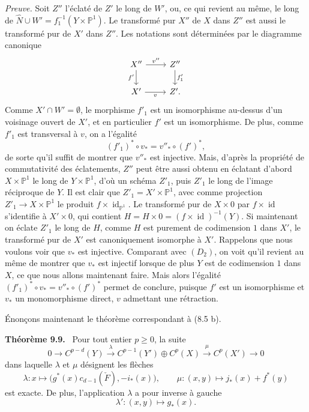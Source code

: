 \documentclass[11pt]{article}
\newenvironment{statement}[1]{\par\medskip\noindent\textbf{#1.}\ }{\par\medskip}
\begin{document}
\emph{Preuve.} Soit $Z''$ l'éclaté de $Z'$ le long de $W'$, ou, ce qui revient au même, le long de $\widehat N\cup W'=f_1^{-1}(Y\times\mathbb P^1)$. Le transformé pur $X''$ de $X$ dans $Z''$ est aussi le transformé pur de $X'$ dans $Z''$. Les notations sont déterminées par le diagramme canonique
\[
\begin{tikzcd}
X''\arrow[r,"v''"]\arrow[d,"f'"']&Z''\arrow[d,"f'_1"]\\
X'\arrow[r,"v"']&Z'.
\end{tikzcd}
\]
Comme $X'\cap W'=\emptyset$, le morphisme $f'_1$ est un isomorphisme au-dessus d'un voisinage ouvert de $X'$, et en particulier $f'$ est un isomorphisme. De plus, comme $f'_1$ est transversal à $v$, on a l'égalité
\[
(f'_1)^*\circ v_*=v''_*\circ(f')^*,
\tag{9.8.8}
\]
de sorte qu'il suffit de montrer que $v''_*$ est injective. Mais, d'après la propriété de commutativité des éclatements, $Z''$ peut être aussi obtenu en éclatant d'abord $X\times\mathbb P^1$ le long de $Y\times\mathbb P^1$, d'où un schéma $Z'_1$, puis $Z'_1$ le long de l'image réciproque de $Y$. Il est clair que $Z'_1=X'\times\mathbb P^1$, avec comme projection $Z'_1\to X\times\mathbb P^1$ le produit $f\times\operatorname{id}_{\mathbb P^1}$. Le transformé pur de $X\times0$ par $f\times\operatorname{id}$ s'identifie à $X'\times0$, qui contient $H=H\times0=(f\times\operatorname{id})^{-1}(Y)$. Si maintenant on éclate $Z'_1$ le long de $H$, comme $H$ est purement de codimension $1$ dans $X'$, le transformé pur de $X'$ est canoniquement isomorphe à $X'$. Rappelons que nous voulons voir que $v_*$ est injective. Comparant avec $(D_2)$, on voit qu'il revient au même de montrer que $v_*$ est injectif lorsque de plus $Y$ est de codimension $1$ dans $X$, ce que nous allons maintenant faire. Mais alors l'égalité $(f'_1)^*\circ v_*=v''_*\circ(f')^*$ permet de conclure, puisque $f'$ est un isomorphisme et $v_*$ un monomorphisme direct, $v$ admettant une rétraction.

Énonçons maintenant le théorème correspondant à (8.5 b).

\begin{statement}{Théorème 9.9}
Pour tout entier $p\ge0$, la suite
\[
0\to C^{p-d}(Y)\xrightarrow{\lambda} C^{p-1}(Y')\oplus C^p(X)\xrightarrow{\mu} C^p(X')\to0
\]
dans laquelle $\lambda$ et $\mu$ désignent les flèches
\[
\lambda:x\mapsto\bigl(g^*(x)c_{d-1}(\check F),-i_*(x)\bigr),
\qquad
\mu:(x,y)\mapsto j_*(x)+f^*(y)
\]
est exacte. De plus, l'application $\lambda$ a pour inverse à gauche
\[
\lambda':(x,y)\mapsto g_*(x).
\]
\end{statement}
\end{document}
